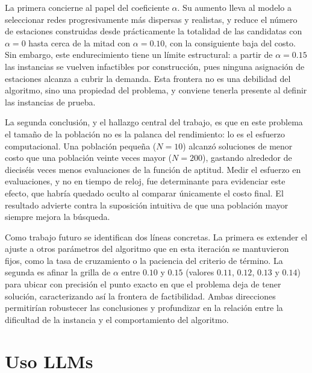 \documentclass[letter, 10pt]{article}
\begin{document}
La primera concierne al papel del coeficiente $\alpha$. Su aumento lleva al modelo a seleccionar
redes progresivamente más dispersas y realistas, y reduce el número de estaciones construidas desde
prácticamente la totalidad de las candidatas con $\alpha = 0$ hasta cerca de la mitad con
$\alpha = 0.10$, con la consiguiente baja del costo. Sin embargo, este endurecimiento tiene un
límite estructural: a partir de $\alpha = 0.15$ las instancias se vuelven infactibles por
construcción, pues ninguna asignación de estaciones alcanza a cubrir la demanda. Esta frontera no es
una debilidad del algoritmo, sino una propiedad del problema, y conviene tenerla presente al definir
las instancias de prueba.

La segunda conclusión, y el hallazgo central del trabajo, es que en este problema el tamaño de la
población no es la palanca del rendimiento: lo es el esfuerzo computacional. Una población pequeña
($N = 10$) alcanzó soluciones de menor costo que una población veinte veces mayor ($N = 200$),
gastando alrededor de dieciséis veces menos evaluaciones de la función de aptitud. Medir el esfuerzo
en evaluaciones, y no en tiempo de reloj, fue determinante para evidenciar este efecto, que habría
quedado oculto al comparar únicamente el costo final. El resultado advierte contra la suposición
intuitiva de que una población mayor siempre mejora la búsqueda.

Como trabajo futuro se identifican dos líneas concretas. La primera es extender el ajuste a otros
parámetros del algoritmo que en esta iteración se mantuvieron fijos, como la tasa de cruzamiento o
la paciencia del criterio de término. La segunda es afinar la grilla de $\alpha$ entre $0.10$ y
$0.15$ (valores $0.11$, $0.12$, $0.13$ y $0.14$) para ubicar con precisión el punto exacto en que el
problema deja de tener solución, caracterizando así la frontera de factibilidad. Ambas direcciones
permitirían robustecer las conclusiones y profundizar en la relación entre la dificultad de la
instancia y el comportamiento del algoritmo.



\newpage

\section{Uso LLMs}
\end{document}
